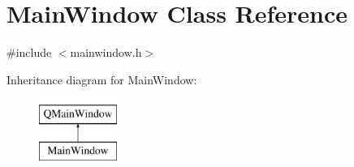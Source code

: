 \hypertarget{class_main_window}{\section{Main\-Window Class Reference}
\label{class_main_window}
}


{\ttfamily \#include $<$mainwindow.\-h$>$}

Inheritance diagram for Main\-Window\-:\begin{figure}[H]
\begin{center}
\leavevmode
\includegraphics[height=2.000000cm]{class_main_window}
\end{center}
\end{figure}
